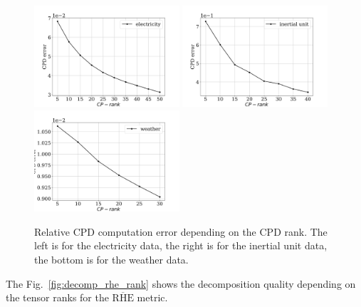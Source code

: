 \documentclass[referee, pdflatex, sn-mathphys-num]{sn-jnl}
\theoremstyle{definition}
\theoremstyle{plain}
\begin{document}
\begin{appendices}
		\begin{figure}[h]
			\centering
			\includegraphics[width=0.48\textwidth, keepaspectratio]{CPD_error_elec.png}
			\includegraphics[width=0.48\textwidth, keepaspectratio]{CPD_error_motion.png}
			\includegraphics[width=0.48\textwidth, keepaspectratio]{CPD_error_weather.png}
			\caption{Relative CPD computation error depending on the CPD rank. The left is for the electricity data, the right is for the inertial unit data, the bottom is for the weather data.}\label{fig:cpd_errors}
		\end{figure}
		
		The Fig.~\ref{fig:decomp_rhe_rank} shows the decomposition quality depending on the tensor ranks for the $ \overline{\text{RHE}} $ metric.
		

\end{appendices}
\end{document}
